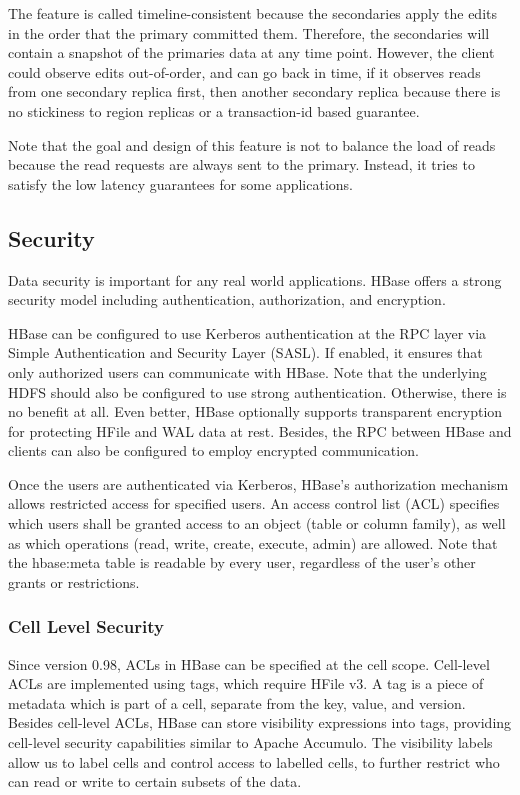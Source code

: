 \documentclass[11pt]{book}
\begin{document}
The feature is called timeline-consistent because the secondaries apply the edits in the order that the primary committed them. Therefore, the secondaries will contain a snapshot of the primaries data at any time point. However, the client could observe edits out-of-order, and can go back in time, if it observes reads from one secondary replica first, then another secondary replica because there is no stickiness to region replicas or a transaction-id based guarantee.

Note that the goal and design of this feature is not to balance the load of reads because the read requests are always sent to the primary. Instead, it tries to satisfy the low latency guarantees for some applications.

\subsection{Security}
Data security is important for any real world applications. HBase offers a strong security model including authentication, authorization, and encryption.

HBase can be configured to use Kerberos authentication at the RPC layer via Simple Authentication and Security Layer (SASL). If enabled, it ensures that only authorized users can communicate with HBase. Note that the underlying HDFS should also be configured to use strong authentication. Otherwise, there is no benefit at all. Even better, HBase optionally supports transparent encryption for protecting HFile and WAL data at rest. Besides, the RPC between HBase and clients can also be configured to employ encrypted communication.

Once the users are authenticated via Kerberos, HBase's authorization mechanism allows restricted access for specified users.
An access control list (ACL) specifies which users shall be granted access to an object (table or column family), as well as which operations (read, write, create, execute, admin) are allowed. Note that the hbase:meta table is readable by every user, regardless of the user's other grants or restrictions.

\subsubsection{Cell Level Security}

Since version 0.98, ACLs in HBase can be specified at the cell scope. Cell-level ACLs are implemented using tags, which require HFile v3. A tag is a piece of metadata which is part of a cell, separate from the key, value, and version.  Besides cell-level ACLs,  HBase can store visibility expressions into tags, providing cell-level security capabilities similar to Apache Accumulo. The visibility labels allow us to label cells and control access to labelled cells, to further restrict who can read or write to certain subsets of the data. 
\end{document}
